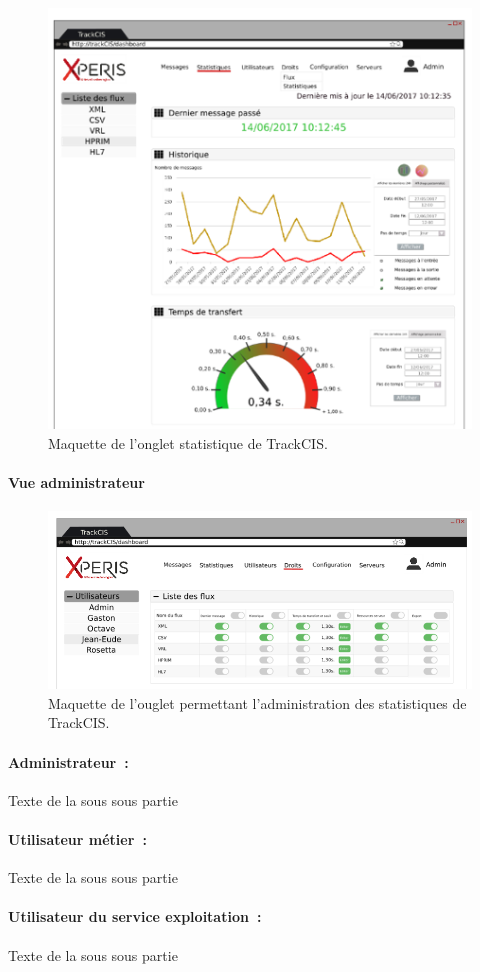 			\begin{figure}[H]
				\centering
				\includegraphics[width=16cm]{../img/part2/maquette_user_1.png}
				\caption{\label{maquette_user} Maquette de l'onglet statistique de
				TrackCIS.}
			\end{figure}
			
			\paragraph{Vue administrateur}
			
			\begin{figure}[H]
				\centering
				\includegraphics[width=16cm]{../img/part2/maquette_admin_1.png}
				\caption{\label{maquette_admin} Maquette de l'ouglet permettant
				l'administration des statistiques de TrackCIS.}
			\end{figure}
		
			\paragraph{Administrateur~:}
			Texte de la sous sous partie
			
			\paragraph{Utilisateur métier~:}
			Texte de la sous sous partie
			
			\paragraph*{Utilisateur du service exploitation~:}
			Texte de la sous sous partie
			